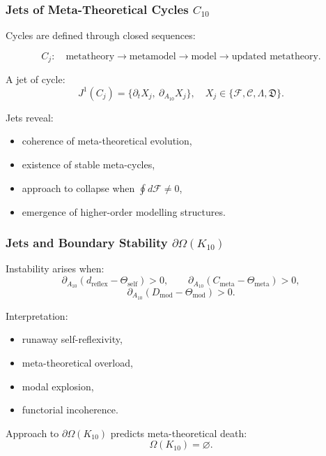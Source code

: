 \subsubsection{Jets of Meta-Theoretical Cycles $C_{10}$}

Cycles are defined through closed sequences:

\[
C_j:
\quad
\text{metatheory}
\to \text{metamodel}
\to \text{model}
\to \text{updated metatheory}.
\]

A jet of cycle:
\[
J^1(C_j)
=
\{\partial_t X_j,\ \partial_{A_{10}}X_j\},
\quad
X_j\in\{\mathcal{F},\mathcal{C},\Lambda,\mathfrak{D}\}.
\]

Jets reveal:
\begin{itemize}
    \item coherence of meta-theoretical evolution,
    \item existence of stable meta-cycles,
    \item approach to collapse when $\oint d\mathcal{F}\neq0$,
    \item emergence of higher-order modelling structures.
\end{itemize}


\subsubsection{Jets and Boundary Stability $\partial\Omega(K_{10})$}

Instability arises when:
\[
\partial_{A_{10}}
(d_{\mathrm{reflex}}-\Theta_{\mathrm{self}}) > 0,
\qquad
\partial_{A_{10}}
(C_{\mathrm{meta}}-\Theta_{\mathrm{meta}}) > 0,
\]
\[
\partial_{A_{10}}
(D_{\mathrm{mod}}-\Theta_{\mathrm{mod}}) > 0.
\]

Interpretation:
\begin{itemize}
    \item runaway self-reflexivity,
    \item meta-theoretical overload,
    \item modal explosion,
    \item functorial incoherence.
\end{itemize}

Approach to $\partial\Omega(K_{10})$ predicts meta-theoretical death:
\[
\Omega(K_{10})=\varnothing.
\]


